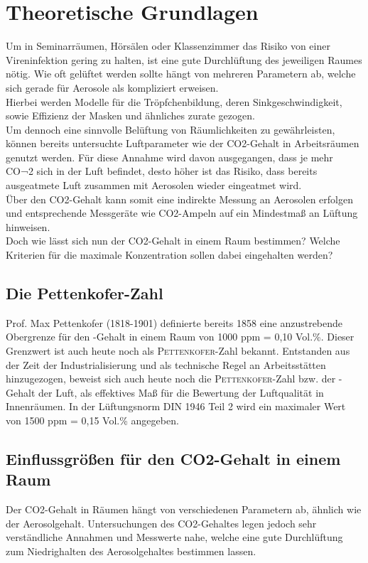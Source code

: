 \section{Theoretische Grundlagen}
Um in Seminarräumen, Hörsälen oder Klassenzimmer das Risiko von einer Vireninfektion gering zu halten, ist eine gute Durchlüftung des jeweiligen Raumes nötig. Wie oft gelüftet werden sollte hängt von mehreren Parametern ab, welche sich gerade für Aerosole als kompliziert erweisen. \\
Hierbei werden Modelle für die Tröpfchenbildung, deren Sinkgeschwindigkeit, sowie Effizienz der Masken und ähnliches zurate gezogen. \\
Um dennoch eine sinnvolle Belüftung von Räumlichkeiten zu gewährleisten, können bereits untersuchte Luftparameter wie der CO2-Gehalt in Arbeitsräumen genutzt werden. Für diese Annahme wird davon ausgegangen, dass je mehr CO¬2 sich in der Luft befindet, desto höher ist das Risiko, dass bereits ausgeatmete Luft zusammen mit Aerosolen wieder eingeatmet wird. \\
Über den CO2-Gehalt kann somit eine indirekte Messung an Aerosolen erfolgen und entsprechende Messgeräte wie CO2-Ampeln auf ein Mindestmaß an Lüftung hinweisen.\\
Doch wie lässt sich nun der CO2-Gehalt in einem Raum bestimmen? Welche Kriterien für die maximale Konzentration sollen dabei eingehalten werden? \cite{Hartmann.2020,Simmank.15.08.2020,bghm2020}

\subsection{Die Pettenkofer-Zahl}
Prof. Max Pettenkofer (1818-1901) definierte bereits 1858 eine anzustrebende Obergrenze für den -Gehalt in einem Raum von 1000 ppm = 0,10 Vol.\%. Dieser Grenzwert ist auch heute noch als \textsc{Pettenkofer}-Zahl bekannt.
Entstanden aus der Zeit der Industrialisierung und als technische Regel an Arbeitsstätten hinzugezogen, beweist sich auch heute noch die \textsc{Pettenkofer}-Zahl bzw. der -Gehalt der Luft, als effektives Maß für die Bewertung der Luftqualität in Innenräumen. 
In der Lüftungsnorm DIN 1946 Teil 2 wird ein maximaler Wert von 1500 ppm = 0,15 Vol.\% angegeben.

\subsection{Einflussgrößen für den CO2-Gehalt in einem Raum}
Der CO2-Gehalt in Räumen hängt von verschiedenen Parametern ab, ähnlich wie der Aerosolgehalt. Untersuchungen des CO2-Gehaltes legen jedoch sehr verständliche Annahmen und Messwerte nahe, welche eine gute Durchlüftung zum Niedrighalten des Aerosolgehaltes bestimmen lassen.

